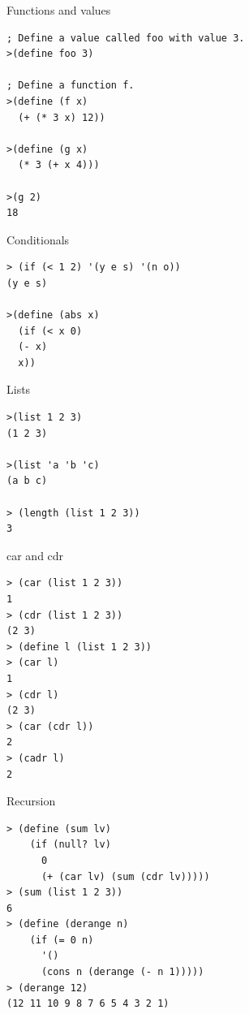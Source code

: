 \begin{frame}[fragile]{Functions and values}
\begin{verbatim}
; Define a value called foo with value 3.
>(define foo 3)

; Define a function f.  
>(define (f x)
  (+ (* 3 x) 12))

>(define (g x)
  (* 3 (+ x 4)))

>(g 2)
18
\end{verbatim}
\end{frame}

\begin{frame}[fragile]{Conditionals}
  \begin{verbatim}
> (if (< 1 2) '(y e s) '(n o))
(y e s)

>(define (abs x)
  (if (< x 0)
  (- x)
  x))

\end{verbatim}
\end{frame}


\begin{frame}[fragile]{Lists}
  \begin{verbatim}
>(list 1 2 3)
(1 2 3)

>(list 'a 'b 'c)
(a b c)

> (length (list 1 2 3))
3
\end{verbatim}
\end{frame}

\begin{frame}[fragile]{car and cdr}
  \begin{verbatim}
> (car (list 1 2 3))
1
> (cdr (list 1 2 3))
(2 3)
> (define l (list 1 2 3))
> (car l)
1
> (cdr l)
(2 3)
> (car (cdr l))
2
> (cadr l)
2
\end{verbatim}
\end{frame}

\begin{frame}[fragile]{Recursion}
  \begin{verbatim}
> (define (sum lv)              
    (if (null? lv)
      0
      (+ (car lv) (sum (cdr lv)))))
> (sum (list 1 2 3))                            
6
> (define (derange n)
    (if (= 0 n)
      '()
      (cons n (derange (- n 1)))))
> (derange 12)                                                    
(12 11 10 9 8 7 6 5 4 3 2 1)
\end{verbatim}
\end{frame}

